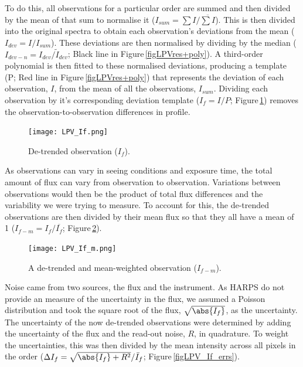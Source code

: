 To do this, all observations for a particular order are summed and then divided by the mean of that sum to normalise it ($I_{sum}=\sum I/\overline{\sum I}$). This is then divided into the original spectra to obtain each observation's deviations from the mean ($I_{dev}=I/I_{sum}$). These deviations are then normalised by dividing by the median ($I_{dev-n}=I_{dev}/\tilde{I}_{dev}$; Black line in Figure\,\ref{figLPVres+poly}). A third-order polynomial is then fitted to these normalised deviations, producing a template (P; Red line in Figure\,\ref{figLPVres+poly}) that represents the deviation of each observation, $I$, from the mean of all the observations, $I_{sum}$. Dividing each observation by it's corresponding deviation template ($I_f = I/P$; Figure\,\ref{figLPV_If}) removes the observation-to-observation differences in profile.\\

\begin{figure}
    \centering
    \captionsetup{width=.8\textwidth}
    \texttt{[image: LPV\_If.png]}
    \caption{De-trended observation ($I_f$).}
    \label{figLPV_If}
\end{figure}

As observations can vary in seeing conditions and exposure time, the total amount of flux can vary from observation to observation. Variations between observations would then be the product of total flux differences and the variability we were trying to measure. To account for this, the de-trended observations are then divided by their mean flux so that they all have a mean of 1 ($I_{f-m}=I_f/\overline{I_f}$; Figure\,\ref{figLPV_If_m}).\\

\begin{figure}
    \centering
    \captionsetup{width=.8\textwidth}
    \texttt{[image: LPV\_If\_m.png]}
    \caption{A de-trended and mean-weighted observation ($I_{f-m}$).}
    \label{figLPV_If_m}
\end{figure}

Noise came from two sources, the flux and the instrument. As HARPS do not provide an measure of the uncertainty in the flux, we assumed a Poisson distribution and took the square root of the flux, $\sqrt{\abs{I_f}}$, as the uncertainty. The uncertainty of the now de-trended observations were determined by adding the uncertainty of the flux and the read-out noise, $R$, in quadrature. To weight the uncertainties, this was then divided by the mean intensity across all pixels in the order ($\Delta I_f = \sqrt{\abs{I_f}+R^2}/\bar{I}_f$; Figure\,\ref{figLPV_If_errs}).\\

